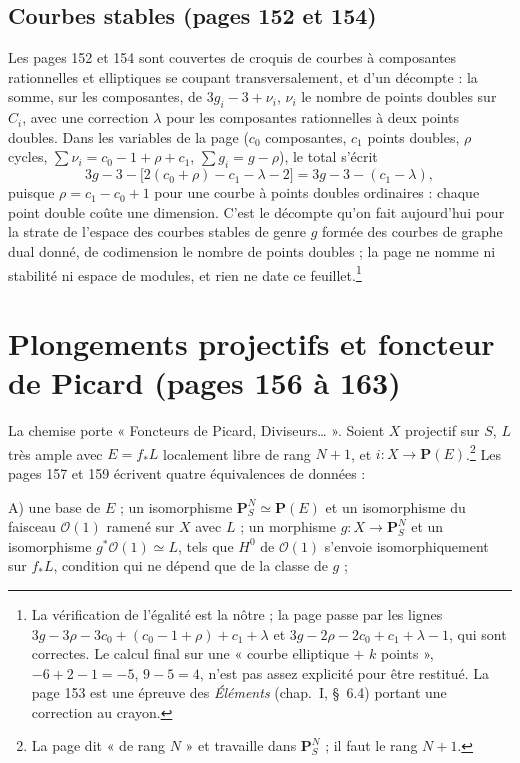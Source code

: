 \documentclass[11pt,a4paper]{article}
\begin{document}
\subsection*{Courbes stables (pages 152 et 154)}

Les pages 152 et 154 sont couvertes de croquis de courbes à composantes
rationnelles et elliptiques se coupant transversalement, et d'un décompte : la
somme, sur les composantes, de $3g_i - 3 + \nu_i$, $\nu_i$ le nombre de points
doubles sur $C_i$, avec une correction $\lambda$ pour les composantes
rationnelles à deux points doubles. Dans les variables de la page ($c_0$
composantes, $c_1$ points doubles, $\rho$ cycles, $\sum \nu_i = c_0 - 1 + \rho + c_1$,
$\sum g_i = g - \rho$), le total s'écrit
\[
3g - 3 - \bigl[2(c_0 + \rho) - c_1 - \lambda - 2\bigr] = 3g - 3 - (c_1 - \lambda) ,
\]
puisque $\rho = c_1 - c_0 + 1$ pour une courbe à points doubles ordinaires :
chaque point double coûte une dimension. C'est le décompte qu'on fait
aujourd'hui pour la strate de l'espace des courbes stables de genre $g$
formée des courbes de graphe dual donné, de codimension le nombre de points
doubles ; la page ne nomme ni stabilité ni espace de modules, et rien ne date
ce feuillet.\footnote{La vérification de l'égalité est la nôtre ; la page
passe par les lignes $3g - 3\rho - 3c_0 + (c_0 - 1 + \rho) + c_1 + \lambda$ et
$3g - 2\rho - 2c_0 + c_1 + \lambda - 1$, qui sont correctes. Le calcul final
sur une « courbe elliptique $+$ $k$ points », $-6 + 2 - 1 = -5$, $9 - 5 = 4$,
n'est pas assez explicité pour être restitué. La page 153 est une épreuve des
\emph{Éléments} (chap.~I, §~6.4) portant une correction au crayon.}

\section*{Plongements projectifs et foncteur de Picard (pages 156 à 163)}

La chemise porte « Foncteurs de Picard, Diviseurs… ». Soient $X$ projectif sur
$S$, $L$ très ample avec $E = f_*L$ localement libre de rang $N + 1$, et
$i \colon X \to \mathbf{P}(E)$.\footnote{La page dit « de rang $N$ » et
travaille dans $\mathbf{P}^N_S$ ; il faut le rang $N + 1$.} Les pages 157 et
159 écrivent quatre équivalences de données :

A) une base de $E$ ; un isomorphisme $\mathbf{P}^N_S \simeq \mathbf{P}(E)$ et un
isomorphisme du faisceau $\mathcal{O}(1)$ ramené sur $X$ avec $L$ ; un morphisme
$g \colon X \to \mathbf{P}^N_S$ et un isomorphisme $g^*\mathcal{O}(1) \simeq L$,
tels que $H^0$ de $\mathcal{O}(1)$ s'envoie isomorphiquement sur $f_*L$,
condition qui ne dépend que de la classe de $g$ ;
\end{document}
